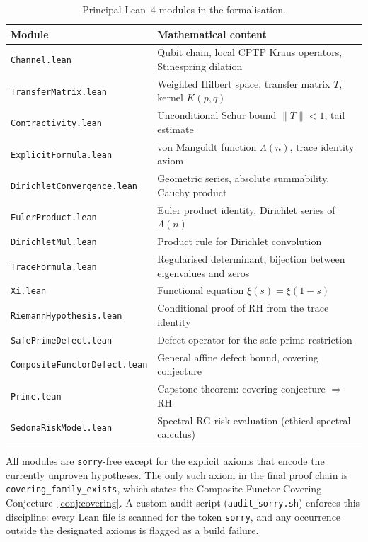 \documentclass[11pt,reqno]{amsart}
\theoremstyle{definition}
\theoremstyle{remark}
\begin{document}
\begin{table}[h]
\centering
\caption{Principal Lean~4 modules in the formalisation.}
\label{tab:lean-modules}
\begin{tabular}{l l}
\toprule
Module & Mathematical content \\
\midrule
\texttt{Channel.lean} & Qubit chain, local CPTP Kraus operators, Stinespring dilation \\
\texttt{TransferMatrix.lean} & Weighted Hilbert space, transfer matrix \(T\), kernel \(K(p,q)\) \\
\texttt{Contractivity.lean} & Unconditional Schur bound \(\|T\|<1\), tail estimate \\
\texttt{ExplicitFormula.lean} & von Mangoldt function \(\Lambda(n)\), trace identity axiom \\
\texttt{DirichletConvergence.lean} & Geometric series, absolute summability, Cauchy product \\
\texttt{EulerProduct.lean} & Euler product identity, Dirichlet series of \(\Lambda(n)\) \\
\texttt{DirichletMul.lean} & Product rule for Dirichlet convolution \\
\texttt{TraceFormula.lean} & Regularised determinant, bijection between eigenvalues and zeros \\
\texttt{Xi.lean} & Functional equation \(\xi(s)=\xi(1-s)\) \\
\texttt{RiemannHypothesis.lean} & Conditional proof of RH from the trace identity \\
\texttt{SafePrimeDefect.lean} & Defect operator for the safe‑prime restriction \\
\texttt{CompositeFunctorDefect.lean} & General affine defect bound, covering conjecture \\
\texttt{Prime.lean} & Capstone theorem: covering conjecture \(\Rightarrow\) RH \\
\texttt{SedonaRiskModel.lean} & Spectral RG risk evaluation (ethical‑spectral calculus) \\
\bottomrule
\end{tabular}
\end{table}

All modules are \texttt{sorry}-free except for the explicit axioms that encode the currently unproven hypotheses.  The only such axiom in the final proof chain is \texttt{covering\_family\_exists}, which states the Composite Functor Covering Conjecture~\ref{conj:covering}.  A custom audit script (\texttt{audit\_sorry.sh}) enforces this discipline: every Lean file is scanned for the token \texttt{sorry}, and any occurrence outside the designated axioms is flagged as a build failure.
\end{document}
